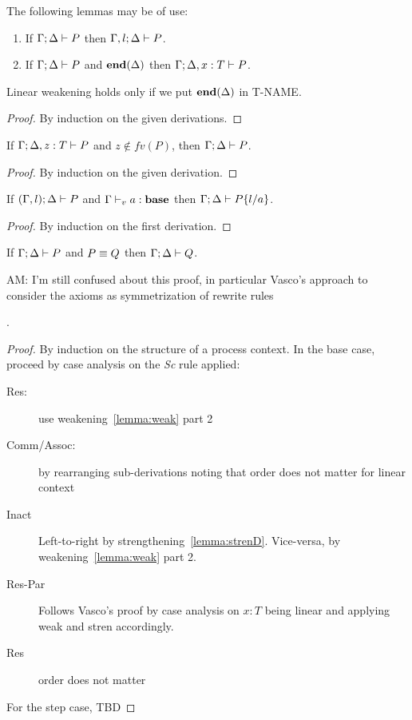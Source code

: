The following lemmas may be of use:
\begin{lemma}[Weakening]\mbox{}
  \label{lemma:weak}
  \begin{enumerate}
  \item If \( \Gamma; \Delta \vdash P \) then
    \( \Gamma, l;\Delta \vdash P \).
      \item If \( \Gamma; \Delta \vdash P \) and \( \mathbf{end}(\Delta) \) then
    \( \Gamma;\Delta, x : T \vdash P \).
\end{enumerate}
\end{lemma}
\begin{metanote}
  Linear weakening holds only if we put $\mathbf{end}(\Delta)$ in T-NAME.
\end{metanote}
\begin{proof}
  By induction on the given derivations.
\end{proof}
\begin{lemma}[Strengthening]\mbox{}
  \label{lemma:strenD}
  If \( \Gamma; \Delta, z : T \vdash P \) and $z\not\in fv(P)$, then \( \Gamma; \Delta \vdash P \).
\end{lemma}
\begin{proof}
  By induction on the given derivation.
\end{proof}

\begin{lemma}[Substitution]\mbox{}
  If $(\Gamma, l);\Delta \vdash P$ and ${\Gamma \vdash_v a : \mathbf{base}}$ then
  \( \Gamma;\Delta \vdash P\{l/a\} \).
\end{lemma}
\begin{proof}
  By induction on the first derivation.
\end{proof}
\begin{lemma}
  If \( \Gamma;\Delta \vdash P \) and \( P \equiv Q \) then \( \Gamma;\Delta \vdash Q \).
\end{lemma}
\begin{metanote}
  AM: I'm still confused about this proof, in particular Vasco's approach to consider the axioms as symmetrization of rewrite rules
\end{metanote}.
\begin{proof}
  By induction on the structure of a process context. In the base case, proceed by case analysis on the \textsl{Sc} rule applied:
  \begin{description}
  \item[Res:] use weakening~\ref{lemma:weak} part 2
  \item[Comm/Assoc:] by rearranging sub-derivations noting that  order does not matter for linear context
  \item[Inact] Left-to-right by
    strengthening~\ref{lemma:strenD}. Vice-versa, by weakening~\ref{lemma:weak} part 2.
  \item[Res-Par] Follows Vasco's proof by case analysis on $x : T$ being linear and applying weak and stren accordingly.
  \item[Res] order does not matter
  \end{description}
  For the step case, TBD
\end{proof}

